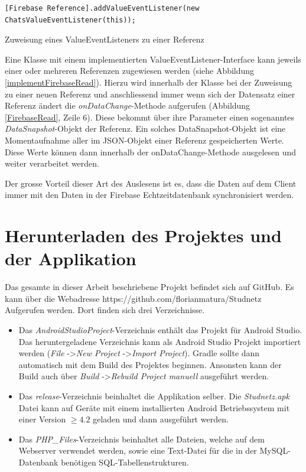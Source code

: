 \documentclass[../main.tex]{subfiles}
\begin{document}
\begin{code}
	\begin{center}
		\begin{verbatim}
[Firebase Reference].addValueEventListener(new ChatsValueEventListener(this));
		\end{verbatim}
		\caption{Zuweisung eines ValueEventListeners zu einer Referenz}
		\label{implementFirebaseRead}
	\end{center}
\end{code}
	
	Eine Klasse mit einem implementierten ValueEventListener-Interface kann jeweils einer oder mehreren Referenzen zugewiesen werden (siehe Abbildung \ref{implementFirebaseRead}). Hierzu wird innerhalb der Klasse bei der Zuweisung zu einer neuen Referenz und anschliessend immer wenn sich der Datensatz einer Referenz ändert die \emph{onDataChange}-Methode aufgerufen (Abbildung \ref{FirebaseRead}, Zeile 6). Diese bekommt über ihre Parameter einen sogenanntes \emph{DataSnapshot}-Objekt der Referenz. Ein solches DataSnapshot-Objekt ist eine Momentaufnahme aller im JSON-Objekt einer Referenz gespeicherten Werte. Diese Werte können dann innerhalb der onDataChange-Methode ausgelesen und weiter verarbeitet werden.
	
	Der grosse Vorteil dieser Art des Auslesens ist es, dass die Daten auf dem Client immer mit den Daten in der Firebase Echtzeitdatenbank synchronisiert werden.
	
	
	\section{Herunterladen des Projektes und der Applikation} \label{github}
	Das gesamte in dieser Arbeit beschriebene Projekt befindet sich auf GitHub. Es kann über die Webadresse https://github.com/florianmatura/Studnetz Aufgerufen werden. Dort finden sich drei Verzeichnisse.
	
	\begin{itemize}
		\item Das \emph{AndroidStudioProject}-Verzeichnis enthält das Projekt für Android Studio. Das heruntergeladene Verzeichnis kann als Android Studio Projekt importiert werden (\emph{File} -\textgreater \emph{New Project} -\textgreater \emph{Import Project}). Gradle sollte dann automatisch mit dem Build des Projektes beginnen. Ansonsten kann der Build auch über \emph{Build} -\textgreater \emph{Rebuild Project manuell} ausgeführt werden.
		\item Das \emph{release}-Verzeichnis beinhaltet die Applikation selber. Die \emph{Studnetz.apk} Datei kann auf Geräte mit einem installierten Android Betriebssystem mit einer Version $\ge4.2$ geladen und dann ausgeführt werden.
		\item Das \emph{PHP\_Files}-Verzeichnis beinhaltet alle Dateien, welche auf dem Webserver verwendet werden, sowie eine Text-Datei für die in der MySQL-Datenbank benötigen SQL-Tabellenstrukturen.
	\end{itemize}
\end{document}
